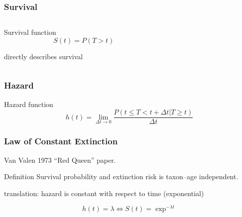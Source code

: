 \documentclass{beamer}
\begin{document}
\begin{frame}
  \frametitle{Survival}

  \begin{columns}
    \begin{column}{0.5\textwidth}
      \begin{block}{Survival function}
        \begin{equation}
        S(t) = P(T > t)
        \label{eq:surv}
      \end{equation}
    \end{block}

    directly describes survival
    \end{column}
    \begin{column}{0.5\textwidth} 
    \end{column}
  \end{columns}
\end{frame}

\begin{frame}
  \frametitle{Hazard}
  \begin{block}{Hazard function}
    \begin{equation}
      h(t) = \lim_{\Delta t \to 0} \frac{P(t \leq T < t + \Delta t | T \geq t)}{\Delta t}
      \label{eq:haz}
    \end{equation}
  \end{block}

\end{frame}

\begin{frame}
  \frametitle{Law of Constant Extinction}

  Van Valen 1973 ``Red Queen'' paper.

  \begin{alertblock}{Definition}
      Survival probability and extinction risk is taxon--age independent.
  \end{alertblock}

  translation: hazard is constant with respect to time (\alert{exponential})

  \begin{equation}
    h(t) = \lambda \iff S(t) = \exp^{-\lambda t}
    \label{eq:constant}
  \end{equation}

\end{frame}
\end{document}
